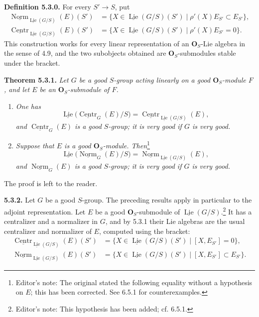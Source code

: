 \medskip
\noindent\textbf{Definition 5.3.0.}
For every \(S'\to S\), put
\[
\begin{split}
 \underline{\operatorname{Norm}}_{\underline{\operatorname{Lie}}(G/S)}
   (E)(S')
 &=\{X\in\underline{\operatorname{Lie}}(G/S)(S')
      \mid \rho'(X)E_{S'}\subset E_{S'}\},\\
 \underline{\operatorname{Centr}}_{\underline{\operatorname{Lie}}(G/S)}
   (E)(S')
 &=\{X\in\underline{\operatorname{Lie}}(G/S)(S')
      \mid \rho'(X)E_{S'}=0\}.
\end{split}
\]
This construction works for every linear representation of an
\(\mathbf O_S\)-Lie algebra in the sense of 4.9, and the two
subobjects obtained are \(\mathbf O_S\)-submodules stable under the
bracket.

\medskip
\noindent\textbf{Theorem 5.3.1.}
\textit{Let \(G\) be a good \(S\)-group acting linearly on a good
\(\mathbf O_S\)-module \(F\), and let \(E\) be an
\(\mathbf O_S\)-submodule of \(F\).}
\begin{enumerate}
\renewcommand{\labelenumi}{(\roman{enumi})}
\item \textit{One has}
\[
 \underline{\operatorname{Lie}}
   \bigl(\underline{\operatorname{Centr}}_G(E)/S\bigr)
 =
 \underline{\operatorname{Centr}}_
   {\underline{\operatorname{Lie}}(G/S)}(E),
\]
\textit{and \(\underline{\operatorname{Centr}}_G(E)\) is a good
\(S\)-group; it is very good if \(G\) is very good.}
\item \textit{Suppose that \(E\) is a good \(\mathbf O_S\)-module.
Then}\footnote{Editor's note: The original stated the following
equality without a hypothesis on \(E\); this has been corrected. See
6.5.1 for counterexamples.}
\[
 \underline{\operatorname{Lie}}
   \bigl(\underline{\operatorname{Norm}}_G(E)/S\bigr)
 =
 \underline{\operatorname{Norm}}_
   {\underline{\operatorname{Lie}}(G/S)}(E),
\]
\textit{and \(\underline{\operatorname{Norm}}_G(E)\) is a good
\(S\)-group; it is very good if \(G\) is very good.}
\end{enumerate}
The proof is left to the reader.

\medskip
\noindent\textbf{5.3.2.}
Let \(G\) be a good \(S\)-group. The preceding results apply in
particular to the adjoint representation. Let \(E\) be a good
\(\mathbf O_S\)-submodule of
\(\underline{\operatorname{Lie}}(G/S)\).\footnote{Editor's note: This
hypothesis has been added; cf. 6.5.1.} It has a centralizer and a
normalizer in \(G\), and by 5.3.1 their Lie algebras are the usual
centralizer and normalizer of \(E\), computed using the bracket:
\[
\begin{split}
 \underline{\operatorname{Centr}}_
   {\underline{\operatorname{Lie}}(G/S)}(E)(S')
 &=\{X\in\underline{\operatorname{Lie}}(G/S)(S')
       \mid[X,E_{S'}]=0\},\\
 \underline{\operatorname{Norm}}_
   {\underline{\operatorname{Lie}}(G/S)}(E)(S')
 &=\{X\in\underline{\operatorname{Lie}}(G/S)(S')
       \mid[X,E_{S'}]\subset E_{S'}\}.
\end{split}
\]

